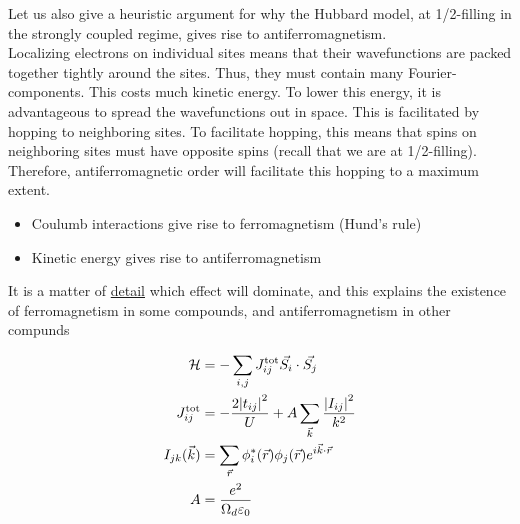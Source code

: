 Let us also give a heuristic argument for why the Hubbard model, at 1/2-filling in the strongly coupled regime, gives rise to antiferromagnetism. \\

Localizing electrons on individual sites means that their wavefunctions are packed together tightly around the sites. Thus, they must contain many Fourier-components. This costs much kinetic energy. To lower this energy, it is advantageous to spread the wavefunctions out in space. This is facilitated by hopping to neighboring sites. To facilitate hopping, this means that spins on neighboring sites must have opposite spins (recall that we are at 1/2-filling). Therefore, antiferromagnetic order will facilitate this hopping to a maximum extent.

\begin{itemize}
    \item Coulumb interactions give rise to ferromagnetism (Hund's rule)
    
    \item Kinetic energy gives rise to antiferromagnetism
\end{itemize}

\begin{tcolorbox}
It is a matter of \underline{detail} which effect will dominate, and this explains the existence of ferromagnetism in some compounds, and antiferromagnetism in other compunds
\end{tcolorbox}

\begin{align}
    \mathcal{H} &= -\sum_{i, j} J_{ij}^{\text{tot}} \Vec{S_i} \cdot \Vec{S_j} \\
    J_{ij}^{\text{tot}} &= - \frac{2\abs{t_{ij}}^2}{U} + A\sum_{\Vec{k}}\frac{\abs{I_{ij}}^2}{k^2} \\
    I_{jk}(\Vec{k}) &= \sum_{\Vec{r}}\phi_i^*(\Vec{r})\phi_j(\Vec{r}) e^{i\Vec{k} \cdot \Vec{r}} \\
A &= \frac{e^2}{\Omega_d \varepsilon_0}
\end{align}
